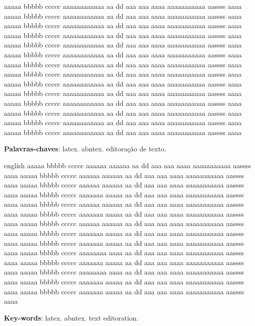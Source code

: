 
\begin{resumo}
aaaaa bbbbb ccccc aaaaaaaaaaaa aa dd  aaa aaa aaaa aaaaaaaaaaa aassss aaaa 
aaaaa bbbbb ccccc aaaaaaaaaaaa aa dd  aaa aaa aaaa aaaaaaaaaaa aassss aaaa
aaaaa bbbbb ccccc aaaaaaaaaaaa aa dd  aaa aaa aaaa aaaaaaaaaaa aassss aaaa
aaaaa bbbbb ccccc aaaaaaaaaaaa aa dd  aaa aaa aaaa aaaaaaaaaaa aassss aaaa
aaaaa bbbbb ccccc aaaaaaaaaaaa aa dd  aaa aaa aaaa aaaaaaaaaaa aassss aaaa
aaaaa bbbbb ccccc aaaaaaaaaaaa aa dd  aaa aaa aaaa aaaaaaaaaaa aassss aaaa
aaaaa bbbbb ccccc aaaaaaaaaaaa aa dd  aaa aaa aaaa aaaaaaaaaaa aassss aaaa
aaaaa bbbbb ccccc aaaaaaaaaaaa aa dd  aaa aaa aaaa aaaaaaaaaaa aassss aaaa
aaaaa bbbbb ccccc aaaaaaaaaaaa aa dd  aaa aaa aaaa aaaaaaaaaaa aassss aaaa
aaaaa bbbbb ccccc aaaaaaaaaaaa aa dd  aaa aaa aaaa aaaaaaaaaaa aassss aaaa
aaaaa bbbbb ccccc aaaaaaaaaaaa aa dd  aaa aaa aaaa aaaaaaaaaaa aassss aaaa
aaaaa bbbbb ccccc aaaaaaaaaaaa aa dd  aaa aaa aaaa aaaaaaaaaaa aassss aaaa
aaaaa bbbbb ccccc aaaaaaaaaaaa aa dd  aaa aaa aaaa aaaaaaaaaaa aassss aaaa
aaaaa bbbbb ccccc aaaaaaaaaaaa aa dd  aaa aaa aaaa aaaaaaaaaaa aassss aaaa

 \vspace{\onelineskip}
    
 \noindent
 \textbf{Palavras-chaves}: latex. abntex. editoração de texto.
\end{resumo}

\begin{resumo}[Abstract]
 \begin{otherlanguage*}{english}
  aaaaa bbbbb ccccc aaaaaa aaaaaa aa dd  aaa aaa aaaa aaaaaaaaaaa aassss aaaa 
aaaaa bbbbb ccccc aaaaaa aaaaaa aa dd  aaa aaa aaaa aaaaaaaaaaa aassss aaaa
aaaaa bbbbb ccccc aaaaaa aaaaaa aa dd  aaa aaa aaaa aaaaaaaaaaa aassss aaaa
aaaaa bbbbb ccccc aaaaaaa aaaaa aa dd  aaa aaa aaaa aaaaaaaaaaa aassss aaaa
aaaaa bbbbb ccccc aaaaaa aaaaaa aa dd  aaa aaa aaaa aaaaaaaaaaa aassss aaaa
aaaaa bbbbb ccccc aaaaaaa aaaaa aa dd  aaa aaa aaaa aaaaaaaaaaa aassss aaaa
aaaaa bbbbb ccccc aaaaaa aaaaaa aa dd  aaa aaa aaaa aaaaaaaaaaa aassss aaaa
aaaaa bbbbb ccccc aaaaaaa aaaaa aa dd  aaa aaa aaaa aaaaaaaaaaa aassss aaaa
aaaaa bbbbb ccccc aaaaaaa aaaaa aa dd  aaa aaa aaaa aaaaaaaaaaa aassss aaaa
aaaaa bbbbb ccccc aaaaaaaa aaaa aa dd  aaa aaa aaaa aaaaaaaaaaa aassss aaaa
aaaaa bbbbb ccccc aaaaaaa aaaaa aa dd  aaa aaa aaaa aaaaaaaaaaa aassss aaaa
aaaaa bbbbb ccccc aaaaaaaa aaaa aa dd  aaa aaa aaaa aaaaaaaaaaa aassss aaaa
aaaaa bbbbb ccccc aaaaaaa aaaaa aa dd  aaa aaa aaaa aaaaaaaaaaa aassss aaaa
aaaaa bbbbb ccccc aaaaaaa aaaaa aa dd  aaa aaa aaaa aaaaaaaaaaa aassss aaaa

   \vspace{\onelineskip}
 
   \noindent 
   \textbf{Key-words}: latex. abntex. text editoration.
 \end{otherlanguage*}
\end{resumo}
